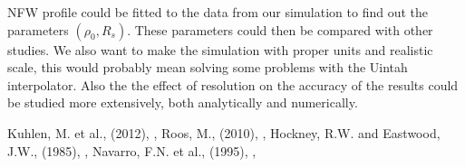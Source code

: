 \documentclass[notitlepage, 12pt]{article}
\begin{document}
NFW profile could be fitted to the data from our simulation to find out the parameters $(\rho_0,R_s)$. These parameters could then be compared with other studies. We also want to make the simulation with proper units and realistic scale, this would probably mean solving some problems with the Uintah interpolator. Also the the effect of resolution on the accuracy of the results could be studied more extensively, both analytically and numerically. 

        

        

\renewcommand{\refname}{REFERENCES}
\begin{thebibliography}{}
Kuhlen, M. et al., (2012),
,
Roos, M., (2010),
,
Hockney, R.W. and Eastwood, J.W., (1985),
,
Navarro, F.N. et al., (1995),
,
\end{thebibliography}
\end{document}
